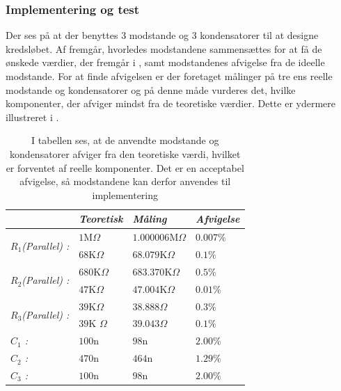 \subsubsection{Implementering og test} 
Der ses på  at der benyttes 3 modstande og 3 kondensatorer til at designe kredsløbet. Af  fremgår, hvorledes modstandene sammensættes for at få de ønskede værdier, der fremgår i , samt modstandenes afvigelse fra de ideelle modstande. For at finde afvigelsen er der foretaget målinger på tre ens reelle modstande og kondensatorer og på denne måde vurderes det, hvilke komponenter, der afviger mindst fra de teoretiske værdier. Dette er ydermere illustreret i .
\begin{table}[H]
	\centering
	\begin{tabular}{|l|l|l|l|}
		\hline
		\textit{}                                     & \textit{Teoretisk} & \textit{Måling}    & \textit{Afvigelse} \\ \hline
		\multirow{2}{*}{\textit{$R_{1}$(Parallel) :}} & $1$M$\Omega$       & $1.000006$M$\Omega$  & $0.007\%$           \\ \cline{2-4} 
		                                              & $68$K$\Omega$      & $68.079$K$\Omega$ & $0.1\%$           \\ \hline
		\multirow{2}{*}{\textit{$R_{2}$(Parallel) :}} & $680$K$\Omega$     & $683.370$K$\Omega$  & $0.5\%$           \\ \cline{2-4} 
	                                               	  & $47$K$\Omega$      & $47.004$K$\Omega$ & $0.01\%$           \\ \hline
		\multirow{2}{*}{\textit{$R_{3}$(Parallel) :}} & $39$K$\Omega$      & $38.888\Omega$    & $0.3\%$           \\ \cline{2-4} 
		                                              & $39$K $\Omega$     & $39.043\Omega$        & $0.1\%$           \\ \hline
		\textit{$C_{1}$ :}                            & $100$n             & $98$n              & $2.00\%$           \\ \hline
		\textit{$C_{2}$ :}                            & $470$n             & $464$n             & $1.29\%$           \\ \cline{2-4} 
		\textit{$C_{3}$ :}                            & $100$n             & $98$n              & $2.00\%$           \\ \hline
	\end{tabular}
	\caption{I tabellen ses, at de anvendte modstande og kondensatorer afviger fra den teoretiske værdi, hvilket er forventet af reelle komponenter. Det er en acceptabel afvigelse, så modstandene kan derfor anvendes til implementering}
	\label{Tab:Maalingfilter}
\end{table}
